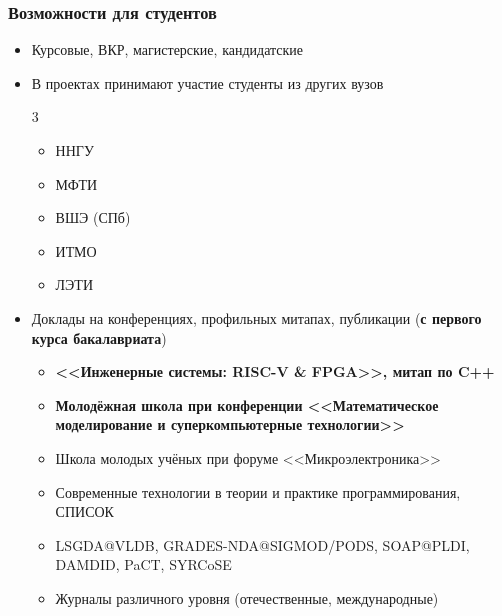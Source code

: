 \documentclass[xcolor=table,aspectratio=169]{beamer}
\begin{document}
\begin{frame}[fragile]
  \frametitle{Возможности для студентов}
  \begin{itemize}
      \item Курсовые, ВКР, магистерские, кандидатские
      \item В проектах принимают участие студенты из других вузов
      \begin{multicols}{3}
      \begin{itemize}
        \item ННГУ
        \item МФТИ
        \item ВШЭ (СПб)
        \item ИТМО
        \item ЛЭТИ
      \end{itemize}
      \end{multicols}
      \item Доклады на конференциях, профильных митапах, публикации (\textbf{с первого курса бакалавриата})
      \begin{itemize}
        \item \textbf{<<Инженерные системы: RISC-V \& FPGA>>, митап по C++}
        \item \textbf{Молодёжная школа при конференции <<Математическое моделирование и суперкомпьютерные технологии>>}        
        \item Школа молодых учёных при форуме <<Микроэлектроника>>
        \item Современные технологии в теории и практике программирования, СПИСОК
        \item LSGDA@VLDB, GRADES-NDA@SIGMOD/PODS, SOAP@PLDI, DAMDID, PaCT, SYRCoSE
        \item Журналы различного уровня (отечественные, международные)
      \end{itemize}
  \end{itemize} 
\end{frame}
\end{document}
